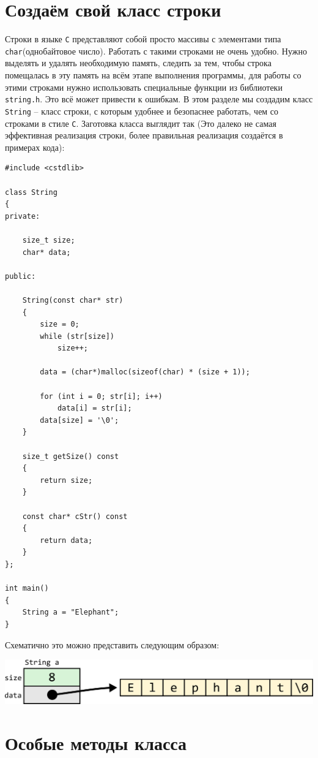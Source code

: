 \documentclass{article}
\begin{document}
\section*{Создаём свой класс строки}
Строки в языке \texttt{C} представляют собой просто массивы с элементами типа \texttt{char}(однобайтовое число). Работать с такими строками не очень удобно. Нужно выделять и удалять необходимую память, следить за тем, чтобы строка помещалась в эту память на всём этапе выполнения программы, для работы со этими строками нужно использовать специальные функции из библиотеки \texttt{string.h}. Это всё может привести к ошибкам. В этом разделе мы создадим класс \texttt{String} -- класс строки, с которым удобнее и безопаснее работать, чем со строками в стиле \texttt{C}. Заготовка класса выглядит так (Это далеко не самая эффективная реализация строки, более правильная реализация создаётся в примерах кода):
\begin{lstlisting}
#include <cstdlib>

class String 
{
private:

    size_t size;
    char* data;
    
public:

    String(const char* str) 
    {
        size = 0;
        while (str[size])
            size++;
		
        data = (char*)malloc(sizeof(char) * (size + 1));
		
        for (int i = 0; str[i]; i++)
            data[i] = str[i];
        data[size] = '\0';
    }
	
    size_t getSize() const 
    {
        return size;
    }
    
    const char* cStr() const 
    {
        return data;
    }
};

int main() 
{
    String a = "Elephant";
}
\end{lstlisting}

Схематично это можно представить следующим образом:
\begin{center}
\includegraphics[scale=0.86]{../images/string_base.png}
\end{center}

\newpage

\section*{Особые методы класса}
\end{document}
